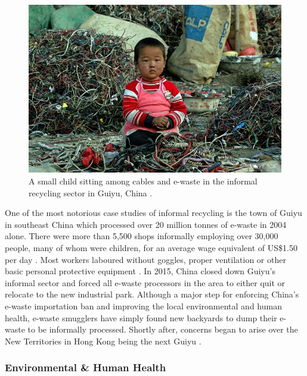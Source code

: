 \documentclass{article}
\begin{document}
\begin{figure}[h]
    \includegraphics[width=.9 \textwidth]{./images/e-waste_guiyu.png}
    \centering
    \caption{A small child sitting among cables and e-waste in the informal recycling sector in Guiyu, China \cite{greenpeace2005guiyuewaste}.}
    \label{guiyu_e-waste}
\end{figure}

One of the most notorious case studies of informal recycling is the town of Guiyu in southeast China which processed over 20 million tonnes of e-waste in 2004 alone. There were more than 5,500 shops informally employing over 30,000 people, many of whom were children, for an average wage equivalent of US\$1.50 per day \cite{chi2011informal, chan2013review}. Most workers laboured without goggles, proper ventilation or other basic personal protective equipment \cite{sthiannopkao2013handling}. In 2015, China closed down Guiyu's informal sector and forced all e-waste processors in the area to either quit or relocate to the new industrial park. Although a major step for enforcing China's e-waste importation ban and improving the local environmental and human health, e-waste smugglers have simply found new backyards to dump their e-waste to be informally processed. Shortly after, concerns began to arise over the New Territories in Hong Kong being the next Guiyu \cite{ban2018carecyclingexport}.


\subsubsection{Environmental \& Human Health}\label{SECTION_RECYCLE_ENVR_IMPACTS}
\end{document}
